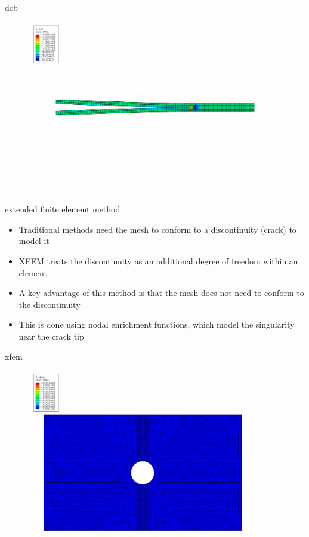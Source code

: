 \documentclass[10pt]{beamer}
\begin{document}
	\begin{frame}{dcb}
		\begin{figure}
			\centering
			\includegraphics[width=0.9\linewidth]{../Figures/dcb9}
		\end{figure}
	\end{frame}
		
	\begin{frame}{extended finite element method}
		\begin{itemize}[<+->]
			\item Traditional methods need the mesh to conform to a discontinuity (crack) to model it
			\item XFEM treats the discontinuity as an additional degree of freedom within an element
			\item A key advantage of this method is that the mesh does not need to conform to the discontinuity
			\item This is done using nodal enrichment functions, which model the singularity near the crack tip
		\end{itemize}
	\end{frame}
	
	\begin{frame}{xfem}
		\begin{figure}
		\centering
		\includegraphics[width=0.9\linewidth]{../Figures/xfem1}
		\end{figure}
	\end{frame}
	
\end{document}
